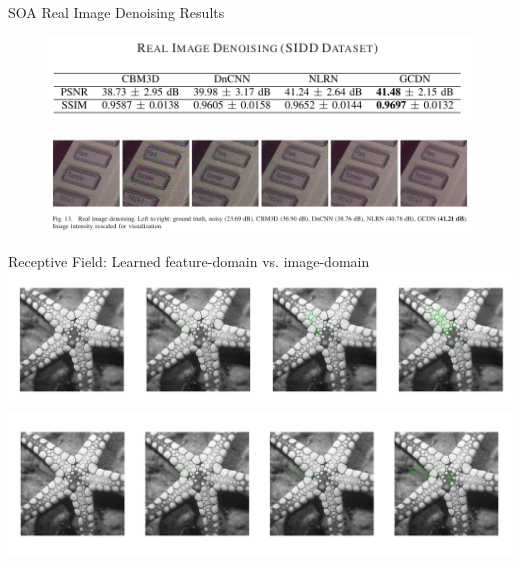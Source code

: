 \documentclass{beamer}
\begin{document}
\begin{frame}{SOA Real Image Denoising Results \cite{ValsesiaICIP19}}
\begin{figure}[H]
\includegraphics[width=0.8\linewidth]{../imgs/soa_real_table.png}
\end{figure}
\begin{figure}[H]
\includegraphics[width=\linewidth]{../imgs/soa_real.png}
\end{figure}
\end{frame}

\begin{frame}{Receptive Field: Learned feature-domain vs. image-domain}
\includegraphics[width=\linewidth]{../imgs/my_receptivefield.png}
\includegraphics[width=\linewidth]{../imgs/dumb_receptivefield.png}
\end{frame}
\end{document}
